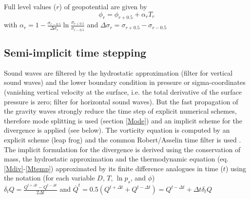 Full level values ($r$) 
of geopotential are given by
\begin{equation}
 \phi_{r}=\phi_{r+0.5}+\alpha_r T_r 
\end{equation}
with
${\displaystyle  \alpha_r=1-\frac{\sigma_{r-0.5}}{\Delta \sigma_r}
 \ln \frac{\sigma_{r+0.5}}{\sigma_{r-0.5}}}$ 
and
$ \Delta \sigma_r=\sigma_{r+0.5} - \sigma_{r-0.5}$\\






\subsection{Semi-implicit time stepping}


Sound waves are filtered by the hydrostatic 
approximation (filter for vertical sound waves) and the lower boundary 
condition in pressure or sigma-coordinates 
(vanishing vertical velocity at the surface, i.e. 
the total derivative of the surface pressure is zero; 
filter for horizontal sound waves).
But the fast propagation of the gravity 
waves strongly reduce the time step of explicit
numerical schemes, therefore mode splitting is used
(section \ref{Mode}) and an implicit scheme for the
divergence is applied (see below). 
The vorticity equation is computed by an explicit scheme (leap frog) and the 
common Robert/Asselin time filter is used \cite{haltiner1982}.\\


The implicit formulation for the divergence is derived 
using the conservation of mass, the hydrostatic approximation
and the thermodynamic equation (eq. \ref{Mdiv}-\ref{Mtemp}) approximated 
by its finite difference analogues in time ($t$) using the
notation (for each variable $D$, $T$, $\ln p_s$, and $\phi$)\\

${\displaystyle \delta_t Q = \frac{Q^{t + \Delta t} - Q^{t - \Delta t}}{2
\Delta t}}$ \hspace{0.8cm}
and \hspace{0.8cm}
${\displaystyle \overline{Q}^t = 0.5 (Q^{t + \Delta t} + Q^{t - \Delta t})
  =Q^{t - \Delta t} + \Delta t \delta_t Q}  $\\



